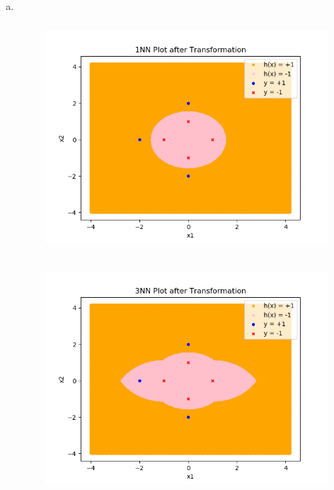 \documentclass[11pt]{article}
\begin{document}
\begin{enumerate} [(a)]
	\item \  \begin{figure}[htb] 
			{\includegraphics[height=8.5cm]{p6_1_b_1.png}}
	\end{figure}
	\begin{figure}[htb] 
			{\includegraphics[height=8.5cm]{p6_1_b_3.png}}
	\end{figure}
\end{enumerate}

\newpage
\end{document}
